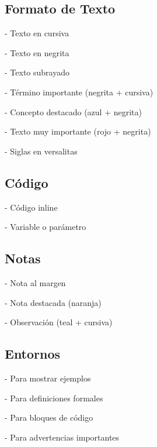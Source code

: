 \documentclass{template_pid}
\begin{document}
\subsection{Formato de Texto}
\begin{listapuntos}
    \item {} - Texto en cursiva
    \item {} - Texto en negrita
    \item {} - Texto subrayado
    \item {} - Término importante (negrita + cursiva)
    \item {} - Concepto destacado (azul + negrita)
    \item {} - Texto muy importante (rojo + negrita)
    \item {} - Siglas en versalitas
\end{listapuntos}

\subsection{Código}
\begin{listapuntos}
    \item {} - Código inline
    \item {} - Variable o parámetro
\end{listapuntos}

\subsection{Notas}
\begin{listapuntos}
    \item {} - Nota al margen
    \item {} - Nota destacada (naranja)
    \item {} - Observación (teal + cursiva)
\end{listapuntos}

\subsection{Entornos}
\begin{listapuntos}
    \item {} - Para mostrar ejemplos
    \item {} - Para definiciones formales
    \item {} - Para bloques de código
    \item {} - Para advertencias importantes
\end{listapuntos}
\end{document}
